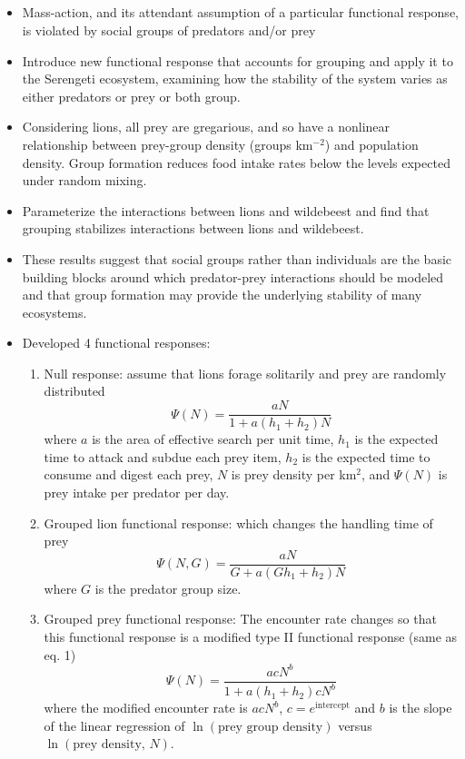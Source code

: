 \documentclass[a4paper,10pt]{report}
\begin{document}
\subsection*{\cite{Fryxelletal:2007}}
\begin{itemize}
\item Mass-action, and its attendant assumption of a particular functional response, is violated by social groups of predators and/or prey
\item Introduce new functional response that accounts for grouping and apply it to the Serengeti ecosystem, examining how the stability of the system varies as either predators or prey or both group. 
\item Considering lions, all prey are gregarious, and so have a nonlinear relationship between prey-group density (groups km$^{-2}$) and population density. Group formation reduces food intake rates below the levels expected under random mixing. 
\item Parameterize the interactions between lions and wildebeest and find that grouping stabilizes interactions between lions and wildebeest. 
\item These results suggest that social groups rather than individuals are the basic building blocks around which predator-prey interactions should be modeled and that group formation may provide the underlying stability of many ecosystems. 
\item Developed 4 functional responses:
\begin{enumerate}
\item Null response: assume that lions forage solitarily and prey are randomly distributed
\[\Psi(N)=\frac{aN}{1+a(h_1+h_2)N}\]
where $a$ is the area of effective search per unit time, $h_1$ is the expected time to attack and subdue each prey item, $h_2$ is the expected time to consume and digest each prey, $N$ is prey density per km$^2$, and $\Psi(N)$ is prey intake per predator per day. 
\item Grouped lion functional response: which changes the handling time of prey 
\[\Psi(N,G) = \frac{aN}{G+a(Gh_1+h_2)N}\]
where $G$ is the predator group size. 
\item Grouped prey functional response: The encounter rate changes so that this functional response is a modified type II functional response (same as eq. 1) 
\[\Psi(N)=\frac{acN^b}{1+a(h_1+h_2)cN^b}\]
where the modified encounter rate is $acN^b$, $c=e^{\text{intercept}}$ and $b$ is the slope of the linear regression of $\ln(\text{prey group density})$ versus $\ln(\text{prey density, }N)$. 

\end{enumerate}
\end{itemize}
\end{document}

